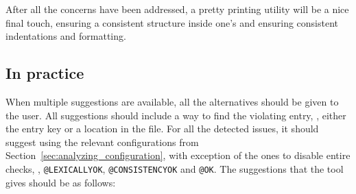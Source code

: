After all the concerns have been addressed, a pretty printing utility
will be a nice final touch, ensuring a consistent structure inside
one's  and ensuring consistent indentations and formatting.

\subsection{In practice}
\label{sec:organizing_practice}

When multiple suggestions are available, all the alternatives should
be given to the user.  All suggestions should include a way to find
the violating entry, \ie, either the entry key or a location in the
file.  For all the detected issues, it should suggest using the
relevant configurations from
Section~\ref{sec:analyzing_configuration}, with exception of the ones
to disable entire checks, \ie, \texttt{@LEXICALLYOK},
\texttt{@CONSISTENCYOK} and \texttt{@OK}.  The suggestions that the
tool gives should be as follows:

